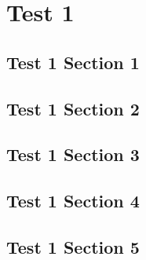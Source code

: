 \chapter{Test 1}
\localtableofcontents
\clearpage

\section{Test 1 Section 1}

\linebreak

\section{Test 1 Section 2}

\linebreak

\section{Test 1 Section 3}

\linebreak

\section{Test 1 Section 4}

\linebreak

\section{Test 1 Section 5}

\linebreak